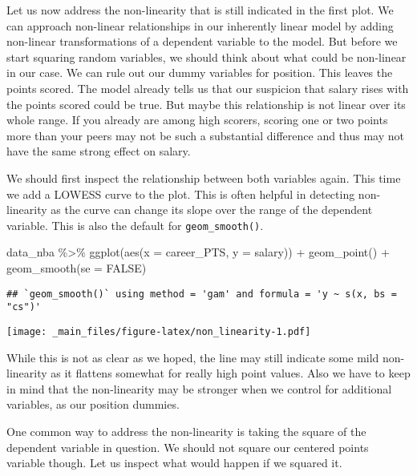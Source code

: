 \documentclass[
]{book}
\newenvironment{Shaded}{\begin{snugshade}}{\end{snugshade}}
\newcommand{\AttributeTok}[1]{\textcolor[rgb]{0.77,0.63,0.00}{#1}}
\newcommand{\AttributeTok}[1]{\textcolor[rgb]{0.13,0.29,0.53}{#1}}
\newcommand{\ConstantTok}[1]{\textcolor[rgb]{0.00,0.00,0.00}{#1}}
\newcommand{\ConstantTok}[1]{\textcolor[rgb]{0.56,0.35,0.01}{#1}}
\newcommand{\FunctionTok}[1]{\textcolor[rgb]{0.00,0.00,0.00}{#1}}
\newcommand{\FunctionTok}[1]{\textcolor[rgb]{0.13,0.29,0.53}{\textbf{#1}}}
\newcommand{\NormalTok}[1]{#1}
\newcommand{\SpecialCharTok}[1]{\textcolor[rgb]{0.00,0.00,0.00}{#1}}
\newcommand{\SpecialCharTok}[1]{\textcolor[rgb]{0.81,0.36,0.00}{\textbf{#1}}}
\begin{document}
Let us now address the non-linearity that is still indicated in the first plot.
We can approach non-linear relationships in our inherently linear model by
adding non-linear transformations of a dependent variable to the model. But
before we start squaring random variables, we should think about what could be
non-linear in our case. We can rule out our dummy variables for position. This
leaves the points scored. The model already tells us that our suspicion that
salary rises with the points scored could be true. But maybe this relationship
is not linear over its whole range. If you already are among high scorers,
scoring one or two points more than your peers may not be such a substantial
difference and thus may not have the same strong effect on salary.

We should first inspect the relationship between both variables again. This time
we add a LOWESS curve to the plot. This is often helpful in detecting
non-linearity as the curve can change its slope over the range of the dependent
variable. This is also the default for \texttt{geom\_smooth()}.

\begin{Shaded}
\begin{Highlighting}[]
\NormalTok{data\_nba }\SpecialCharTok{\%\textgreater{}\%} 
  \FunctionTok{ggplot}\NormalTok{(}\FunctionTok{aes}\NormalTok{(}\AttributeTok{x =}\NormalTok{ career\_PTS, }\AttributeTok{y =}\NormalTok{ salary)) }\SpecialCharTok{+}
  \FunctionTok{geom\_point}\NormalTok{() }\SpecialCharTok{+}
  \FunctionTok{geom\_smooth}\NormalTok{(}\AttributeTok{se =} \ConstantTok{FALSE}\NormalTok{)}
\end{Highlighting}
\end{Shaded}

\begin{verbatim}
## `geom_smooth()` using method = 'gam' and formula = 'y ~ s(x, bs = "cs")'
\end{verbatim}

\texttt{[image: \_main\_files/figure-latex/non\_linearity-1.pdf]}

While this is not as clear as we hoped, the line may still indicate some mild
non-linearity as it flattens somewhat for really high point values. Also we have
to keep in mind that the non-linearity may be stronger when we control for
additional variables, as our position dummies.

One common way to address the non-linearity is taking the square of the
dependent variable in question. We should not square our centered points
variable though. Let us inspect what would happen if we squared it.
\end{document}
